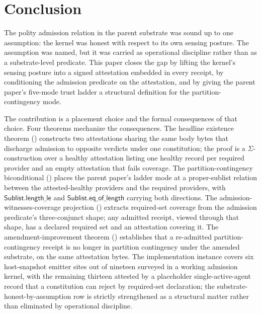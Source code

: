 \section{Conclusion}
\label{sec:conclusion}

The polity admission relation in the parent substrate was sound up to one assumption: the kernel was honest with respect to its own sensing posture. The assumption was named, but it was carried as operational discipline rather than as a substrate-level predicate. This paper closes the gap by lifting the kernel's sensing posture into a signed attestation embedded in every receipt, by conditioning the admission predicate on the attestation, and by giving the parent paper's five-mode trust ladder a structural definition for the partition-contingency mode.

The contribution is a placement choice and the formal consequences of that choice. Four theorems mechanize the consequences. The headline existence theorem () constructs two attestations sharing the same body bytes that discharge admission to opposite verdicts under one constitution; the proof is a $\Sigma$-construction over a healthy attestation listing one healthy record per required provider and an empty attestation that fails coverage. The partition-contingency biconditional () places the parent paper's ladder mode at a proper-sublist relation between the attested-healthy providers and the required providers, with $\mathsf{Sublist.length\_le}$ and $\mathsf{Sublist.eq\_of\_length}$ carrying both directions. The admission-witnesses-coverage projection () extracts required-set coverage from the admission predicate's three-conjunct shape; any admitted receipt, viewed through that shape, has a declared required set and an attestation covering it. The amendment-improvement theorem () establishes that a re-admitted partition-contingency receipt is no longer in partition contingency under the amended substrate, on the same attestation bytes. The implementation instance covers six host-snapshot emitter sites out of nineteen surveyed in a working admission kernel, with the remaining thirteen attested by a placeholder single-active-agent record that a constitution can reject by required-set declaration; the substrate-honest-by-assumption row is strictly strengthened as a structural matter rather than eliminated by operational discipline.


